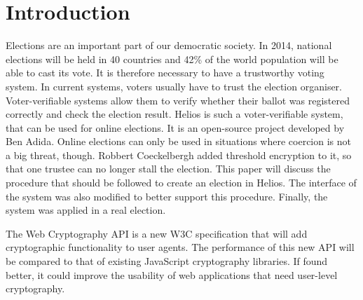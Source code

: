 % 
%

\section{Introduction}

Elections are an important part of our democratic society. In 2014, national elections will be held in 40 countries and 42\% of the world population will be able to cast its vote.\cite{news:economist_2014_ballot_boxes} It is therefore necessary to have a trustworthy voting system. In current systems, voters usually have to trust the election organiser. Voter-verifiable systems allow them to verify whether their ballot was registered correctly and check the election result. Helios is such a voter-verifiable system, that can be used for online elections. It is an open-source project developed by Ben Adida.\cite{site:adida_helios_documentation} Online elections can only be used in situations where coercion is not a big threat, though. Robbert Coeckelbergh added threshold encryption to it, so that one trustee can no longer stall the election.\cite{coeckelbergh_application_and_extension_of_the_helios_voting_system} This paper will discuss the procedure that should be followed to create an election in Helios. The interface of the system was also modified to better support this procedure. Finally, the system was applied in a real election.

\par The Web Cryptography API is a new W3C specification that will add cryptographic functionality to user agents.\cite{sleevi_watson_web_cryptography_api} The performance of this new API will be compared to that of existing JavaScript cryptography libraries. If found better, it could improve the usability of web applications that need user-level cryptography.
